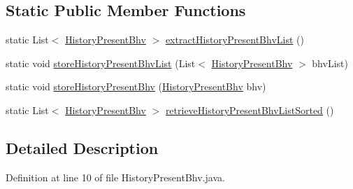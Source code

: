 \subsection*{\-Static \-Public \-Member \-Functions}
\begin{DoxyCompactItemize}
\item 
static \-List$<$ \hyperlink{classlab_1_1davidahn_1_1appshuttle_1_1view_1_1_history_present_bhv}{\-History\-Present\-Bhv} $>$ \hyperlink{classlab_1_1davidahn_1_1appshuttle_1_1view_1_1_history_present_bhv_a9fc21f2dacdb56991aa7a0c349d8a240}{extract\-History\-Present\-Bhv\-List} ()
\item 
static void \hyperlink{classlab_1_1davidahn_1_1appshuttle_1_1view_1_1_history_present_bhv_afb77fe2524c21a74125afa782b7dc3d9}{store\-History\-Present\-Bhv\-List} (\-List$<$ \hyperlink{classlab_1_1davidahn_1_1appshuttle_1_1view_1_1_history_present_bhv}{\-History\-Present\-Bhv} $>$ bhv\-List)
\item 
static void \hyperlink{classlab_1_1davidahn_1_1appshuttle_1_1view_1_1_history_present_bhv_a66f8dd552b278afc5491856e45fb7a60}{store\-History\-Present\-Bhv} (\hyperlink{classlab_1_1davidahn_1_1appshuttle_1_1view_1_1_history_present_bhv}{\-History\-Present\-Bhv} bhv)
\item 
static \-List$<$ \hyperlink{classlab_1_1davidahn_1_1appshuttle_1_1view_1_1_history_present_bhv}{\-History\-Present\-Bhv} $>$ \hyperlink{classlab_1_1davidahn_1_1appshuttle_1_1view_1_1_history_present_bhv_a2c2091974b4ef03bd8262641795c92fa}{retrieve\-History\-Present\-Bhv\-List\-Sorted} ()
\end{DoxyCompactItemize}


\subsection{\-Detailed \-Description}


\-Definition at line 10 of file \-History\-Present\-Bhv.\-java.



